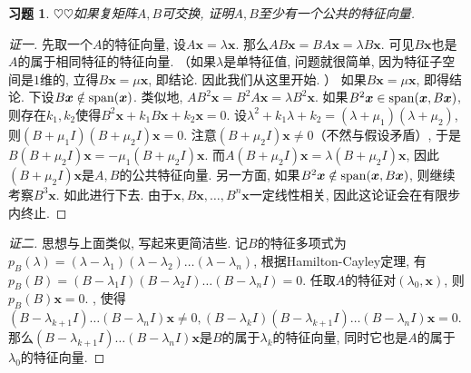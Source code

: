 \documentclass{ctexart}
\newtheorem{exercise}[thm]{习题}
\newcommand\bs[1]{\boldsymbol{ #1}}
\newcommand\hint[1]{\par {\footnotesize\kaishu 提示：#1}}
\def\hard{$\heartsuit$}
\DeclareMathOperator{\subspan}{span}
\DeclarePairedDelimiter\spanbasic{(}{)}
\newcommand\lspan[1]{\subspan\spanbasic*{#1}}
\begin{document}
\begin{exercise}
\hard\hard 如果复矩阵$A, B$可交换, 证明$A, B$至少有一个公共的特征向量. 

\end{exercise}
\begin{proof}[证一]
	先取一个$A$的特征向量, 设$A\bs x=\lambda\bs x$. 那么$AB\bs x=BA\bs x=\lambda B\bs x$. 可见$B\bs x$也是$A$的属于相同特征的特征向量. 
	（如果$\lambda$是单特征值, 问题就很简单, 因为特征子空间是$1$维的, 立得$B\bs x=\mu \bs x$, 即结论. 因此我们从这里开始. ）
	如果$B\bs x=\mu \bs x$, 即得结论. 下设$B\bs x\notin\lspan{\bs x}$. 
	类似地, $AB^2\bs x=B^2 A\bs x=\lambda B^2\bs x$. 如果$B^2\bs x\in\lspan{\bs x,B\bs x}$, 则存在$k_1,k_2$使得$B^2\bs x+k_1B\bs x+k_2\bs x=0$. 设$\lambda^2+k_1\lambda+k_2=(\lambda+\mu_1)(\lambda+\mu_2)$, 则$(B+\mu_1I)(B+\mu_2I)\bs x=0$. 注意$(B+\mu_2I)\bs x\ne0$（不然与假设矛盾）, 于是$B(B+\mu_2I)\bs x=-\mu_1(B+\mu_2I)\bs x$. 而$A(B+\mu_2I)\bs x=\lambda(B+\mu_2I)\bs x$, 因此$(B+\mu_2I)\bs x$是$A,B$的公共特征向量. 
	另一方面, 如果$B^2\bs x\notin\lspan{\bs x,B\bs x}$, 则继续考察$B^3\bs x$. 如此进行下去. 
	由于$\bs x,B\bs x,\dots,B^n\bs x$一定线性相关, 因此这论证会在有限步内终止. 
\end{proof}
\begin{proof}[证二]
	思想与上面类似, 写起来更简洁些. 
	记$B$的特征多项式为$p_B(\lambda)=(\lambda-\lambda_1)(\lambda-\lambda_2)\dots(\lambda-\lambda_n)$, 根据Hamilton-Cayley定理, 有$p_B(B)=(B-\lambda_1I)(B-\lambda_2I)\dots(B-\lambda_nI)=0$. 
	任取$A$的特征对$(\lambda_0,\bs x)$, 则$p_B(B)\bs x=0$. 
	\highlight[id=err,comment={这个貌似不对？如取$A=B=\mu I_n$, 则$p_B(\lambda)=(\lambda-\mu)^n$,$\lambda_1=\cdots=\lambda_n=\mu$. 此时对任意$x$和$k$, 都有$(B-\lambda_{k+1}I)\dots(B-\lambda_nI)\bs x=0$.}]{一定存在$k$}, 使得$(B-\lambda_{k+1}I)\dots(B-\lambda_nI)\bs x\ne0,(B-\lambda_kI)(B-\lambda_{k+1}I)\dots(B-\lambda_nI)\bs x=0$. 
	那么$(B-\lambda_{k+1}I)\dots(B-\lambda_nI)\bs x$是$B$的属于$\lambda_k$的特征向量, 同时它也是$A$的属于$\lambda_0$的特征向量. 
\end{proof}
\end{document}
